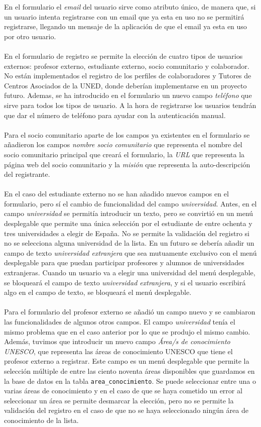 \documentclass[11pt]{book}
\begin{document}
	En el formulario el \emph{email} del usuario sirve como atributo único, de manera que, si un usuario intenta registrarse con un email que ya esta en uso no se permitirá registrarse, llegando un mensaje de la aplicación de que el email ya esta en uso por otro usuario. \\\\
	En el formulario de registro se permite la elección de cuatro tipos de usuarios externos: profesor externo, estudiante externo, socio comunitario y colaborador. No están implementados el registro de los perfiles de colaboradores y Tutores de Centros Asociados de la UNED, donde deberían implementarse en un proyecto futuro. Ademas, se ha introducido en el formulario un nuevo campo \emph{teléfono} que sirve para todos los tipos de usuario. A la hora de registrarse los usuarios tendrán que dar el número de teléfono para ayudar con la autenticación manual.\\\\
	Para el socio comunitario aparte de los campos ya existentes en el formulario se añadieron los campos \emph{nombre socio comunitario} que representa el nombre del socio comunitario
	principal que creará el formulario, la \emph{URL} que representa la página web del socio comunitario y la \emph{misión} que representa la auto-descripción del registrante. \\\\
	En el caso del estudiante externo no se han añadido nuevos campos en el formulario, pero sí el cambio de funcionalidad del campo \emph{universidad}. Antes, en el campo \emph{universidad} se permitía introducir un texto, pero se convirtió en un menú desplegable que permite una única selección por el estudiante de entre ochenta y tres universidades a elegir de España. No se permite la validación del registro si no se selecciona alguna universidad de la lista. En un futuro se debería añadir un campo de texto \emph{universidad extranjera} que sea mutuamente exclusivo con el menú desplegable para que puedan participar profesores y alumnos de universidades extranjeras. Cuando un usuario va a elegir una universidad del menú desplegable, se bloqueará el campo de texto \emph{universidad extranjera}, y si el usuario escribirá algo en el campo de texto, se bloqueará el menú desplegable. \\\\
	Para el formulario del profesor externo se añadió un campo nuevo y se cambiaron las funcionalidades de algunos otros campos. El campo \emph{universidad} tenía el mismo problema que en el caso anterior por lo que se produjo el mismo cambio. Además, tuvimos que introducir un nuevo campo \emph{Área/s de conocimiento UNESCO}, que representa las áreas de conocimiento UNESCO que tiene el profesor externo a registrar. Este campo es un menú desplegable que permite la selección múltiple de entre las ciento noventa áreas disponibles que guardamos en la base de datos en la tabla \texttt{area\_conocimiento}. Se puede seleccionar entre una o varias áreas de conocimiento y en el caso de que se haya cometido un error al seleccionar un área se permite desmarcar la elección, pero no se permite la validación del registro en el caso de que no se haya seleccionado ningún área de conocimiento de la lista.\\\\
\end{document}
